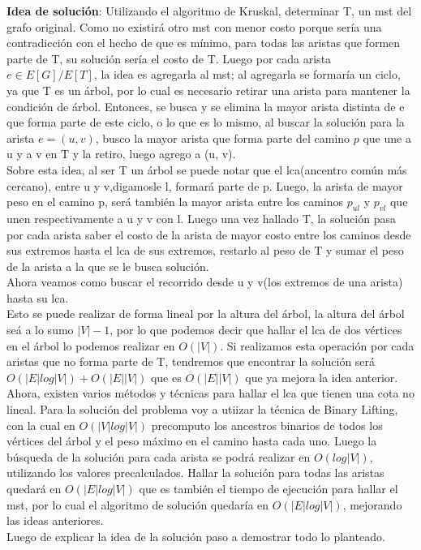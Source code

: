 \documentclass[12pt]{article}
\begin{document}
 
\textbf{Idea de soluci\'on}: Utilizando el algoritmo de Kruskal, determinar T, un mst del grafo original. Como no existir\'a
otro mst con menor costo porque ser\'ia una contradicci\'on con el hecho de que es m\'inimo, para todas las aristas que formen parte
 de T, su soluci\'on ser\'ia el costo de T.  Luego por cada arista $e\in E[G]/E[T]$,  la idea es agregarla al mst; al 
agregarla se formar\'ia un ciclo, ya que T es un \'arbol, por lo cual es necesario retirar una arista para mantener la condici\'on de \'arbol. Entonces,
 se busca y se elimina la mayor arista distinta de e que forma parte de este ciclo, o lo que es lo mismo, al buscar
 la soluci\'on para la arista $e=(u,v)$, busco la mayor arista que forma parte del camino $p$ que une a u y a v en T y la retiro, luego agrego a (u, v).\\
 Sobre esta idea, al ser T un \'arbol se puede notar que el lca(ancentro com\'un m\'as cercano), entre u y v,digamosle l, formar\'a parte de p.  Luego, la arista de mayor peso en el camino p, ser\'a tambi\'en la mayor arista entre los caminos $p_{ul}$ y 
 $p_{vl}$ que unen respectivamente a u y v con l. Luego una vez hallado T, la soluci\'on pasa por cada arista saber el costo
  de la arista de mayor costo entre los caminos desde sus extremos hasta el lca de sus extremos, restarlo al peso de T y sumar el peso de la arista a la que se le busca soluci\'on.\\
 Ahora veamos como buscar el recorrido desde u y v(los extremos de una arista) hasta su lca.\\
 Esto se puede realizar de forma lineal por la altura del \'arbol, la altura del \'arbol se\'a a lo sumo $|V|-1$, por lo que podemos decir que hallar el lca de dos v\'ertices en el \'arbol lo podemos realizar en $O(|V|)$. Si realizamos esta operaci\'on 
 por cada aristas que no forma parte de T, tendremos que encontrar la soluci\'on ser\'a $O(|E|log|V|) + O(|E||V|)$ que es 
  $O(|E||V|)$ que ya mejora la idea anterior.\\
  Ahora, existen varios m\'etodos y t\'ecnicas para hallar el lca que tienen una cota no lineal. Para la soluci\'on del problema voy a utiizar la t\'ecnica de Binary Lifting, con la cual en $O(|V|log|V|)$ precomputo los ancestros binarios de todos los 
  v\'ertices del \'arbol y el peso m\'aximo en el camino hasta cada uno. Luego la b\'usqueda de la soluci\'on para cada arista se podr\'a realizar en $O(log|V|)$, utilizando los valores precalculados. Hallar la soluci\'on para todas las aristas quedar\'a en 
  $O(|E|log|V|)$ que es tambi\'en el tiempo de ejecuci\'on para hallar el mst, por lo cual el algoritmo de soluci\'on quedar\'ia en $O(|E|log|V|)$, mejorando las ideas anteriores.\\
  Luego de explicar la idea de la soluci\'on paso a demostrar todo lo planteado.\\
 \\
 
\end{document}
